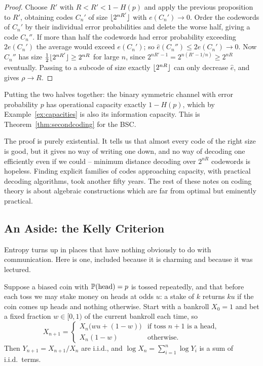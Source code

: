 \documentclass[a4paper]{scrartcl}
\DeclarePairedDelimiter{\floor}{\lfloor}{\rfloor}
\begin{document}
\begin{proof}
	Choose $R'$ with $R<R'<1-H(p)$ and apply the previous proposition to $R'$, obtaining codes $C_n'$ of size $\floor{2^{nR'}}$ with $e(C_n')\to0$. Order the codewords of $C_n'$ by their individual error probabilities and delete the worse half, giving a code $C_n''$. If more than half the codewords had error probability exceeding $2e(C_n')$ the average would exceed $e(C_n')$; so $\hat e(C_n'')\le 2e(C_n')\to0$. Now $C_n''$ has size $\tfrac12\floor{2^{nR'}} \ge 2^{nR}$ for large $n$, since $2^{nR'-1} = 2^{n(R'-1/n)} \ge 2^{nR}$ eventually. Passing to a subcode of size exactly $\floor{2^{nR}}$ can only decrease $\hat e$, and gives $\rho \to R$.
\end{proof}

Putting the two halves together: the binary symmetric channel with error probability $p$ has operational capacity exactly $1 - H(p)$, which by Example~\ref{ex:capacities} is also its information capacity. This is Theorem~\ref{thm:secondcoding} for the BSC.

\begin{remark}
	The proof is purely existential. It tells us that almost every code of the right size is good, but it gives no way of writing one down, and no way of decoding one efficiently even if we could -- minimum distance decoding over $2^{nR}$ codewords is hopeless. Finding explicit families of codes approaching capacity, with practical decoding algorithms, took another fifty years. The rest of these notes on coding theory is about algebraic constructions which are far from optimal but eminently practical.
\end{remark}

\subsection{An Aside: the Kelly Criterion}

Entropy turns up in places that have nothing obviously to do with communication. Here is one, included because it is charming and because it was lectured.

Suppose a biased coin with $\mathbb{P}(\text{head}) = p$ is tossed repeatedly, and that before each toss we may stake money on heads at odds $u$: a stake of $k$ returns $ku$ if the coin comes up heads and nothing otherwise. Start with a bankroll $X_0 = 1$ and bet a fixed fraction $w \in [0,1)$ of the current bankroll each time, so
$$X_{n+1} = \begin{cases} X_n\bigl(wu + (1-w)\bigr) & \text{if toss } n+1 \text{ is a head},\\ X_n(1-w) & \text{otherwise.}\end{cases}$$
Then $Y_{n+1} = X_{n+1}/X_n$ are i.i.d., and $\log X_n = \sum_{i=1}^n \log Y_i$ is a sum of i.i.d.\ terms.
\end{document}
